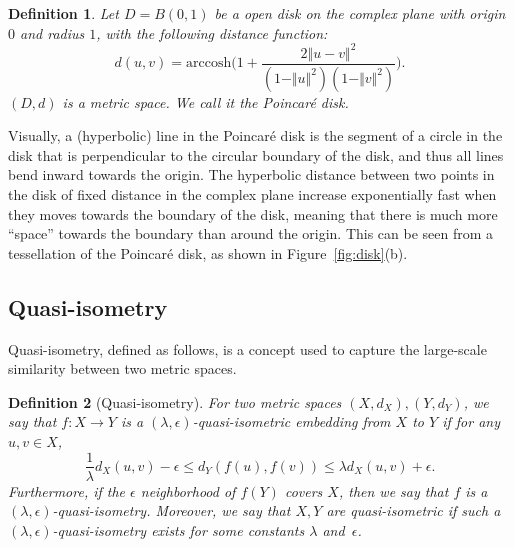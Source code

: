 \documentclass[11pt]{article}
\newtheorem{defi}{Definition}
\begin{document}
\begin{defi}
Let $D=B(0,1)$ be a open disk on the complex plane with origin $0$ and
	radius $1$, with the following distance function:
\[ d(u,v) = \mathrm{arccosh}\bigg(1+\frac{2\Vert u - v \Vert^{2}}{(1-\Vert u \Vert^{2})(1-\Vert v \Vert^{2})} \bigg). \]
$(D,d)$ is a metric space. We call it the Poincar\'{e} disk.
\end{defi}


\noindent
Visually, a (hyperbolic) line in the Poincar\'{e} disk is the segment of a 
circle in the disk that is perpendicular to the circular boundary of the 
disk, and thus all lines bend inward towards the origin.
The hyperbolic distance between two points in the disk of fixed distance
	in the complex plane increase exponentially fast when they moves
	towards the boundary of the disk, meaning that there is much more
	``space'' towards the boundary than around the origin.
This can be seen from a tessellation of the Poincar\'{e} disk, as shown
	in Figure~\ref{fig:disk}(b).


\subsection{Quasi-isometry}

Quasi-isometry, defined as follows, is a concept used to capture the 
large-scale similarity between two metric spaces.
\begin{defi}[Quasi-isometry]
For two metric spaces $(X,d_{X}), (Y,d_{Y})$, we say that $f: X \to Y$ is a $(\lambda,\epsilon)$-quasi-isometric embedding from $X$ to $Y$ if for any 
	$u,v \in X$,
\[ \frac{1}{\lambda}d_{X}(u,v) - \epsilon \leq d_{Y}(f(u),f(v)) \leq \lambda d_{X}(u,v) + \epsilon. \]
Furthermore, if the $\epsilon$ neighborhood of $f(Y)$ covers $X$, then we 
say that $f$ is a $(\lambda,\epsilon)$-quasi-isometry.
Moreover, we say that $X,Y$ are quasi-isometric if such a 
$(\lambda,\epsilon)$-quasi-isometry exists for some constants $\lambda$ and~$\epsilon$.
\end{defi}
\end{document}
